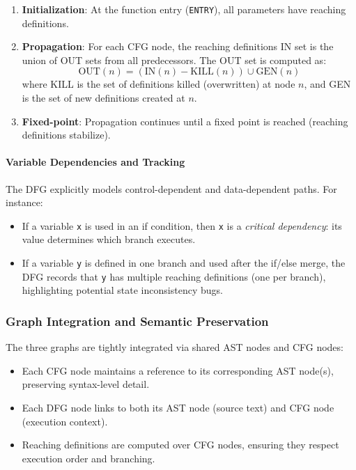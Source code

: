 \begin{enumerate}
    \item \textbf{Initialization}: At the function entry (\texttt{ENTRY}), all parameters have reaching definitions.
    
    \item \textbf{Propagation}: For each CFG node, the reaching definitions IN set is the union of OUT sets from all predecessors. The OUT set is computed as:
    \[
    \text{OUT}(n) = (\text{IN}(n) - \text{KILL}(n)) \cup \text{GEN}(n)
    \]
    where KILL is the set of definitions killed (overwritten) at node $n$, and GEN is the set of new definitions created at $n$.
    
    \item \textbf{Fixed-point}: Propagation continues until a fixed point is reached (reaching definitions stabilize).
\end{enumerate}

\paragraph{Variable Dependencies and Tracking}

The DFG explicitly models control-dependent and data-dependent paths. For instance:

\begin{itemize}
    \item If a variable \texttt{x} is used in an if condition, then \texttt{x} is a \emph{critical dependency}: its value determines which branch executes.
    \item If a variable \texttt{y} is defined in one branch and used after the if/else merge, the DFG records that \texttt{y} has multiple reaching definitions (one per branch), highlighting potential state inconsistency bugs.
\end{itemize}

\subsubsection{Graph Integration and Semantic Preservation}

The three graphs are tightly integrated via shared AST nodes and CFG nodes:

\begin{itemize}
    \item Each CFG node maintains a reference to its corresponding AST node(s), preserving syntax-level detail.
    \item Each DFG node links to both its AST node (source text) and CFG node (execution context).
    \item Reaching definitions are computed over CFG nodes, ensuring they respect execution order and branching.
\end{itemize}

